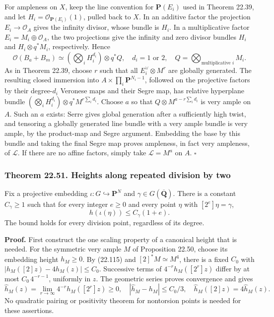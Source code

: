 \documentclass[
  11pt,
  a4paper,
]{article}
\begin{document}
For ampleness on \(X\), keep the line convention for \(\mathbf P(E_i)\)
used in Theorem 22.39, and let \(H_i=\mathcal O_{\mathbf P(E_i)}(1)\),
pulled back to \(X\). In an additive factor the projection
\(E_i\to\mathcal O_A\) gives the infinity divisor, whose bundle is
\(H_i\). In a multiplicative factor \(E_i=M_i\oplus\mathcal O_A\), the
two projections give the infinity and zero divisor bundles \(H_i\) and
\(H_i\otimes q^*M_i\), respectively. Hence \[
 \mathcal O(B_a+B_m)
 \simeq\left(\bigotimes_i H_i^{d_i}\right)\otimes q^*Q,
 \quad d_i=1\text{ or }2,\quad Q=\bigotimes_{\text{multiplicative }i}M_i.
 \tag{22.121}
\] As in Theorem 22.39, choose \(r\) such that all
\(E_i^\vee\otimes M^r\) are globally generated. The resulting closed
immersion into \(A\times\prod_i\mathbf P^{N_i-1}\), followed on the
projective factors by their degree-\(d_i\) Veronese maps and their Segre
map, has relative hyperplane bundle
\((\bigotimes_i H_i^{d_i})\otimes q^*M^{r\sum_i d_i}\). Choose \(a\) so
that \(Q\otimes M^{a-r\sum_i d_i}\) is very ample on \(A\). Such an
\(a\) exists: Serre gives global generation after a sufficiently high
twist, and tensoring a globally generated line bundle with a very ample
bundle is very ample, by the product-map and Segre argument. Embedding
the base by this bundle and taking the final Segre map proves ampleness,
in fact very ampleness, of \(\mathcal L\). If there are no affine
factors, simply take \(\mathcal L=M^a\) on \(A\). \(\square\)

\subsubsection{Theorem 22.51. Heights along repeated division by
two}\label{theorem-22.51.-heights-along-repeated-division-by-two}

Fix a projective embedding \(\iota:G\hookrightarrow\mathbf P^N\) and
\(\gamma\in G(\overline{\mathbf Q})\). There is a constant
\(C_\gamma\ge1\) such that for every integer \(e\ge0\) and every point
\(\eta\) with \([2^e]\eta=\gamma\), \[
 h(\iota(\eta))\le C_\gamma(1+e).
 \tag{22.122}
\] The bound holds for every division point, regardless of its degree.

\textbf{Proof.} First construct the one scaling property of a canonical
height that is needed. For the symmetric very ample \(M\) of Proposition
22.50, choose its embedding height \(h_M\ge0\). By (22.115) and
\([2]^*M\simeq M^4\), there is a fixed \(C_0\) with
\(\left|h_M([2]z)-4h_M(z)\right|\le C_0\). Successive terms of
\(4^{-r}h_M([2^r]z)\) differ by at most \(C_0\,4^{-r-1}\), uniformly in
\(z\). The geometric series proves convergence and gives \[
 \widehat h_M(z)=\lim_{r\to\infty}4^{-r}h_M([2^r]z)\ge0,\quad
 |\widehat h_M-h_M|\le C_0/3,\quad
 \widehat h_M([2]z)=4\widehat h_M(z).
 \tag{22.123}
\] No quadratic pairing or positivity theorem for nontorsion points is
needed for these assertions.
\end{document}
